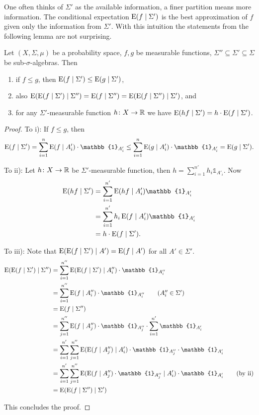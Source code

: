 One often thinks of $\Sigma'$ as the available information, a finer partition means more information. The conditional expectation $\operatorname{E}(f\mid \Sigma')$ is the best approximation of $f$ given only the information from $\Sigma'$. 
With this intuition the statements from the following lemma are not surprising. 
\begin{lemma}
Let $(X,\Sigma,\mu)$ be a probability space, $f,g$ be measurable functions, $\Sigma''\subseteq\Sigma'\subseteq\Sigma$ be sub-$\sigma$-algebras. Then
\begin{enumerate}[label=\roman*)]
\item if $f\leq g$, then $\operatorname{E}(f\mid \Sigma')\leq\operatorname{E}(g\mid \Sigma')$,
\item also $\operatorname{E}(\operatorname{E}(f\mid \Sigma')\mid\Sigma'')=\operatorname{E}(f\mid\Sigma'')=\operatorname{E}(\operatorname{E}(f\mid \Sigma'')\mid\Sigma')$, and
\item for any $\Sigma'$-measurable function $h\colon X\to\mathbb{R}$ we have $\operatorname{E}(h f\mid\Sigma')=h\cdot\operatorname{E}(f\mid\Sigma')$.
\end{enumerate}
\end{lemma}
\begin{proof}
To i): If $f\leq g$, then
\[\E(f\mid \Sigma')=\sum_{i=1}^n\E(f\mid A'_i)\cdot \mathbb{1}_{A'_i}\leq \sum_{i=1}^n\E(g\mid A'_i)\cdot \mathbb{1}_{A'_i}=\E(g\mid \Sigma').\]


To ii): Let $h\colon X\to\mathbb{R}$ be $\Sigma'$-measurable function, then $h=\sum_{i=1}^{n'}h_i\mathbb{1}_{A'_i}$. Now 
\begin{align*}
\E(h f\mid\Sigma')&=\sum_{i=1}^{n'}\E(hf\mid A'_i)\mathbb{1}_{A'_i}\\
&=\sum_{i=1}^{n'}h_i\E(f\mid A'_i)\mathbb{1}_{A'_i}\\
&=h\cdot\E(f\mid\Sigma').
\end{align*}

To iii): Note that $\operatorname{E}(\operatorname{E}(f\mid \Sigma')\mid A')=\operatorname{E}(f\mid A')$ for all $A'\in\Sigma'$.
\begin{align*}
\E(\E(f\mid \Sigma')\mid\Sigma'')&=\sum_{i=1}^{n''}\E(\E(f\mid \Sigma')\mid A''_i)\cdot\mathbb{1}_{A''_i}\\
&=\sum_{i=1}^{n''}\E(f\mid A''_i)\cdot\mathbb{1}_{A''_i}\tag{$A''_i\in\Sigma'$}\\
&=\E(f\mid\Sigma'')\\
&=\sum_{j=1}^{n''}\E(f\mid A''_j)\cdot\mathbb{1}_{A''_j}\cdot\sum_{i=1}^{n'}\mathbb{1}_{A'_i}\\
&=\sum_{i=1}^{n'}\sum_{j=1}^{n''}\E(\E(f\mid A''_j)\mid A'_i)\cdot\mathbb{1}_{A''_j}\cdot\mathbb{1}_{A'_i}\\
&=\sum_{i=1}^{n'}\sum_{j=1}^{n''}\E(\E(f\mid A''_j)\cdot\mathbb{1}_{A''_j}\mid A'_i)\cdot\mathbb{1}_{A'_i}\tag{by ii}\\
&=\E(\E(f\mid \Sigma'')\mid\Sigma')
\end{align*}


This concludes the proof.
\end{proof}


